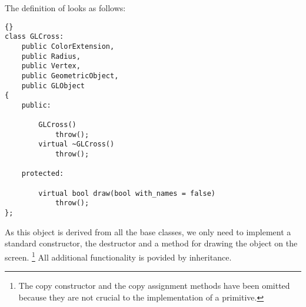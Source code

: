 The definition of  looks as follows:
\begin{lstlisting}{}
class GLCross: 
	public ColorExtension,
	public Radius,
	public Vertex,
	public GeometricObject,
	public GLObject
{
	public:

		GLCross()
			throw();
		virtual ~GLCross()
			throw();

	protected:

		virtual bool draw(bool with_names = false)
			throw();
};
\end{lstlisting}
As this object is derived from all the base classes, we only need to implement
a standard constructor, the destructor and a method for drawing the object on
the screen. \footnote{The copy constructor and the copy assignment methods
have been omitted because they are not crucial to the implementation of a
primitive.} All additional functionality is povided by inheritance.

